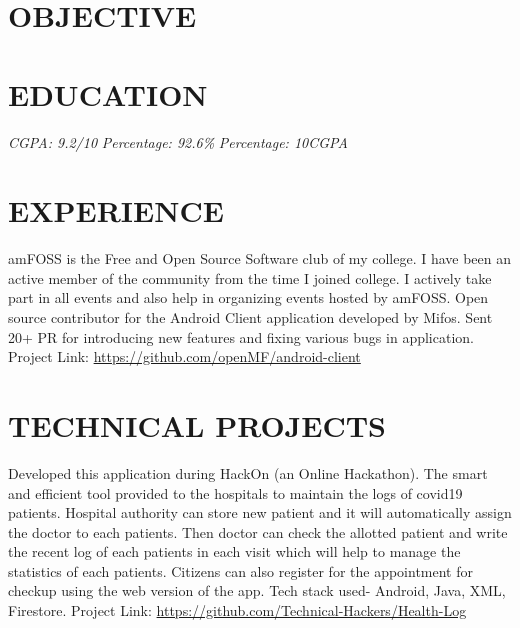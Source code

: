 \documentclass[11pt,a4paper,sans]{moderncv}        %
\begin{document}
\makecvtitle

\section{OBJECTIVE}

\section{EDUCATION}
{\textit{CGPA: 9.2/10}}{}  %
{\textit{Percentage: 92.6\%  }}{}  %
{\textit{Percentage: 10CGPA  }}{}  %

\section{EXPERIENCE}
{amFOSS is the Free and Open Source Software club of my college. I have been an active member of the community from the time I joined college. I actively take part in all events and also help in organizing events hosted by amFOSS.}
{ Open source contributor for the Android Client application developed by Mifos. Sent 20+ PR for introducing new features and fixing various bugs in application. Project Link: {\newline} 
\url{https://github.com/openMF/android-client}}{}  %

\section{TECHNICAL PROJECTS}

{Developed this application during HackOn (an Online Hackathon). The smart and efficient tool provided to the hospitals to maintain the logs of covid19 patients. Hospital authority can store new patient and it will automatically assign the doctor to each patients. Then doctor can check the allotted patient and write the recent log of each patients in each visit which will help to manage the statistics of each patients. Citizens can also register for the appointment for checkup using the web version of the app. Tech stack used- Android, Java, XML, Firestore. Project Link: {\newline}
\url{https://github.com/Technical-Hackers/Health-Log}}{}
\end{document}
